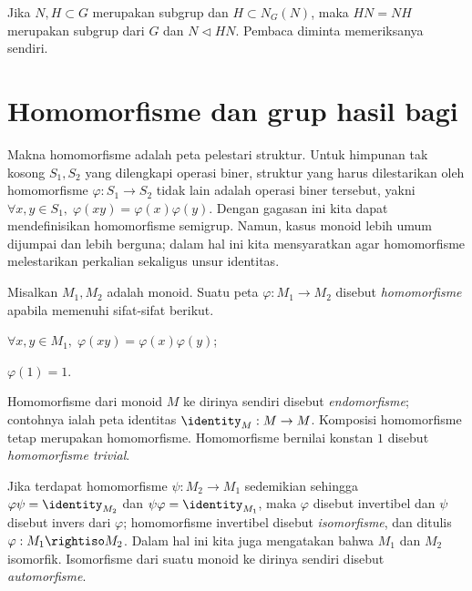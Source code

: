 \begin{remark}\label{rem:HN}
	Jika $N,H\subset G$ merupakan subgrup dan $H\subset N_G(N)$, maka $HN=NH$ merupakan subgrup dari $G$ dan $N\lhd HN$. Pembaca diminta memeriksanya sendiri.
\end{remark}
\section{Homomorfisme dan grup hasil bagi}\label{sec:homomorphism}
Makna homomorfisme adalah peta pelestari struktur. Untuk himpunan tak kosong $S_1, S_2$ yang dilengkapi operasi biner, struktur yang harus dilestarikan oleh homomorfisme $\varphi: S_1 \to S_2$ tidak lain adalah operasi biner tersebut, yakni $\forall x,y \in S_1, \; \varphi(xy)=\varphi(x)\varphi(y)$. Dengan gagasan ini kita dapat mendefinisikan homomorfisme semigrup. Namun, kasus monoid lebih umum dijumpai dan lebih berguna; dalam hal ini kita mensyaratkan agar homomorfisme melestarikan perkalian sekaligus unsur identitas.

\begin{definition}
	Misalkan $M_1, M_2$ adalah monoid. Suatu peta $\varphi: M_1 \to M_2$ disebut \emph{homomorfisme} apabila memenuhi sifat-sifat berikut.
	\begin{compactenum}[(i)]
		\item $\forall x,y \in M_1, \; \varphi(xy) = \varphi(x) \varphi(y)$;
		\item $\varphi(1)=1$.
	\end{compactenum}
	Homomorfisme dari monoid $M$ ke dirinya sendiri disebut \emph{endomorfisme}; contohnya ialah peta identitas $\identity_M: M \to M$. Komposisi homomorfisme tetap merupakan homomorfisme. Homomorfisme bernilai konstan $1$ disebut \emph{homomorfisme trivial}.

	Jika terdapat homomorfisme $\psi: M_2 \to M_1$ sedemikian sehingga $\varphi \psi = \identity_{M_2}$ dan $\psi \varphi = \identity_{M_1}$, maka $\varphi$ disebut invertibel dan $\psi$ disebut invers dari $\varphi$; homomorfisme invertibel disebut \emph{isomorfisme}, dan ditulis $\varphi: M_1 \rightiso M_2$. Dalam hal ini kita juga mengatakan bahwa $M_1$ dan $M_2$ isomorfik. Isomorfisme dari suatu monoid ke dirinya sendiri disebut \emph{automorfisme}.
\end{definition}

